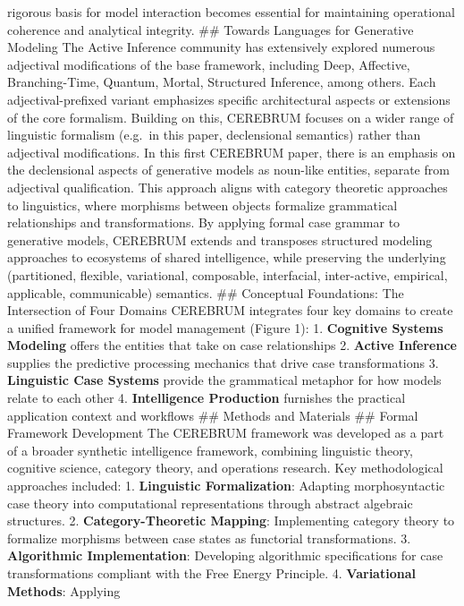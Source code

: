 \documentclass[
  11pt,
  letterpaper,
]{article}
\begin{document}
rigorous basis for model interaction becomes essential for maintaining
operational coherence and analytical integrity. \#\# Towards Languages
for Generative Modeling The Active Inference community has extensively
explored numerous adjectival modifications of the base framework,
including Deep, Affective, Branching-Time, Quantum, Mortal, Structured
Inference, among others. Each adjectival-prefixed variant emphasizes
specific architectural aspects or extensions of the core formalism.
Building on this, CEREBRUM focuses on a wider range of linguistic
formalism (e.g.~in this paper, declensional semantics) rather than
adjectival modifications. In this first CEREBRUM paper, there is an
emphasis on the declensional aspects of generative models as noun-like
entities, separate from adjectival qualification. This approach aligns
with category theoretic approaches to linguistics, where morphisms
between objects formalize grammatical relationships and transformations.
By applying formal case grammar to generative models, CEREBRUM extends
and transposes structured modeling approaches to ecosystems of shared
intelligence, while preserving the underlying (partitioned, flexible,
variational, composable, interfacial, inter-active, empirical,
applicable, communicable) semantics. \#\# Conceptual Foundations: The
Intersection of Four Domains CEREBRUM integrates four key domains to
create a unified framework for model management (Figure 1): 1.
\textbf{Cognitive Systems Modeling} offers the entities that take on
case relationships 2. \textbf{Active Inference} supplies the predictive
processing mechanics that drive case transformations 3.
\textbf{Linguistic Case Systems} provide the grammatical metaphor for
how models relate to each other 4. \textbf{Intelligence Production}
furnishes the practical application context and workflows \#\# Methods
and Materials \#\# Formal Framework Development The CEREBRUM framework
was developed as a part of a broader synthetic intelligence framework,
combining linguistic theory, cognitive science, category theory, and
operations research. Key methodological approaches included: 1.
\textbf{Linguistic Formalization}: Adapting morphosyntactic case theory
into computational representations through abstract algebraic
structures. 2. \textbf{Category-Theoretic Mapping}: Implementing
category theory to formalize morphisms between case states as functorial
transformations. 3. \textbf{Algorithmic Implementation}: Developing
algorithmic specifications for case transformations compliant with the
Free Energy Principle. 4. \textbf{Variational Methods}: Applying
\end{document}
